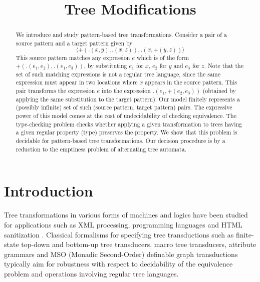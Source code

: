 \documentclass[12pt, a4paper]{article}
\title{Tree Modifications}
\author{}
\date{}
\begin{document}
\maketitle



\begin{abstract}
    We introduce and study pattern-based tree transformations. Consider a pair of a source pattern and a target pattern given by
    \[ \langle +(.(x, y), .(x, z)), .(x, +(y, z)) \rangle \]
    This source pattern matches any expression $e$ which is of the form $+(.(e_1, e_2), .(e_1, e_3))$, by substituting $e_{1}$ for $x$, $e_{2}$ for $y$ and $e_{3}$ for $z$. Note that the set of such matching expressions is not a regular tree language, since the same expression must appear in two locations where $x$ appears in the source pattern. This pair transforms the expression $e$ into the expression $.(e_1, +(e_2, e_3))$ (obtained by applying the same substitution to the target pattern). Our model finitely represents a (possibly infinite) set of such (source pattern, target pattern) pairs. The expressive power of this model comes at the cost of undecidability of checking equivalence. The type-checking problem checks whether applying a given transformation to trees having a given regular property (type) preserves the property. We show that this problem is decidable for pattern-based tree transformations. Our decision procedure is by a reduction to the emptiness problem of alternating tree automata. 
\end{abstract}


\section{Introduction}\label{sec:introduction}

Tree transformations in various forms of machines and logics have been studied for applications such as XML processing, programming languages and HTML sanitization \cite{MSV2000, K1998, DVLM2015, H2010}. Classical formalisms for specifying tree transductions such as finite-state top-down and bottom-up tree transducers, macro tree transducers, attribute grammars and MSO (Monadic Second-Order) definable graph transductions typically aim for robustness with respect to decidability of the equivalence problem and operations involving regular tree languages.
\end{document}
